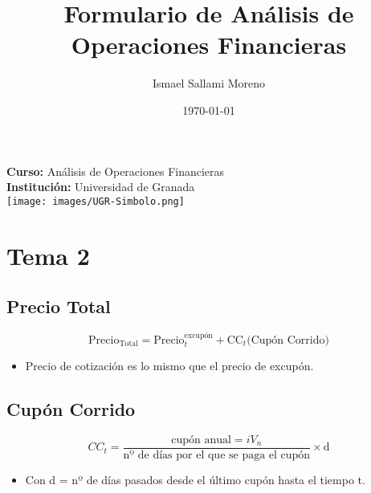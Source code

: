\documentclass[11pt, a4paper]{article}
\title{\color{titleblue}\textbf{Formulario de Análisis de Operaciones Financieras}}
\author{Ismael Sallami Moreno}
\date{\today}
\begin{document}
\maketitle
\thispagestyle{fancy}

\begin{center}
    \textbf{Curso:} Análisis de Operaciones Financieras \\
    \textbf{Institución:} Universidad de Granada \\
    \vspace{1cm}
    \texttt{[image: images/UGR-Simbolo.png]}
\end{center}

\tableofcontents
\newpage

\section{Tema 2}
\subsection{Precio Total}
\begin{tcolorbox}[colframe=blue!50, colback=blue!5] %
\begin{equation}
    \text{Precio}_{\text{Total}} = \text{Precio}_t^{\text{excupón}} + \text{CC}_t \text{(Cupón Corrido)}
\end{equation}
\end{tcolorbox}
\begin{itemize}
    \item Precio de cotización es lo mismo que el precio de excupón.
\end{itemize}

\subsection{Cupón Corrido}
\begin{tcolorbox}[colframe=blue!50, colback=blue!5, sharp corners] %
\begin{equation}
    CC_t =\frac{\text{cupón anual} = iV_n}{\text{nº de días por el que se paga el cupón}} \times \text{d}
\end{equation}
\end{tcolorbox}

\begin{itemize}
    \item Con d = nº de días pasados desde el último cupón hasta el tiempo t.
\end{itemize}
\end{document}
